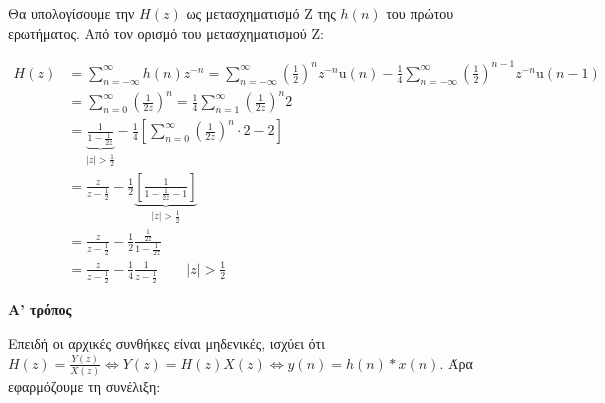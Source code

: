 \documentclass[11pt,a4paper,notitlepage,fleqn]{article}
\begin{document}
\begin{exercise}
\begin{enumpar}
	\item
	

	Θα υπολογίσουμε την \( H(z) \) ως μετασχηματισμό Z της \( h(n) \) του πρώτου ερωτήματος.
	Από τον ορισμό του μετασχηματισμού Z:
	
	\begin{align*}
		H(z) &= \sum_{n=-\infty}^{\infty} h(n)z^{-n} = \sum_{n=-\infty}^{\infty}\left(\frac{1}{2}\right)^n z^{-n}\mathrm{u}(n)
		-\frac{1}{4}\sum_{n=-\infty}^{\infty}\left(\frac{1}{2}\right)^{n-1}z^{-n}\mathrm{u}(n-1)
		\\ &= \sum_{n=0}^{\infty} \left(\frac{1}{2z}\right)^n = \frac{1}{4}\sum_{n=1}^{\infty}\left(\frac{1}{2z}\right)^n 2
		\\ &= \underbrace{\frac{1}{1-\frac{1}{2z}}}_{|z|>\frac{1}{2}}
		- \frac{1}{4}\left[\sum_{n=0}^{\infty} \left(\frac{1}{2z}\right)^n \cdot 2 - 2 \right]
		\\ &= \frac{z}{z-\frac{1}{2}}-\frac{1}{2}\underbrace{\left[
		\frac{1}{1-\frac{1}{2z}-1}
		\right]}_{|z|>\frac{1}{2}}
        \\ &= \frac{z}{z-\frac{1}{2}} -\frac{1}{2}\frac{\frac{1}{2z}}{1-\frac{1}{2z}}
        \\ &
        =\frac{z}{z-\frac{1}{2}} - \frac{1}{4}\frac{1}{z-\frac{1}{2}}\qquad |z|>\frac{1}{2}
	\end{align*}
	
    \item
	\begin{enumgreekpar}
	\item \textbf{Α' τρόπος}
	
	
	Επειδή οι αρχικές συνθήκες είναι μηδενικές, ισχύει ότι \( H(z) = \frac{Y(z)}{X(z)}\iff
	Y(z) = H(z)X(z) \iff y(n) = h(n)*x(n) \). Άρα εφαρμόζουμε τη συνέλιξη:
	

\end{enumgreekpar}
\end{enumpar}
\end{exercise}
\end{document}
